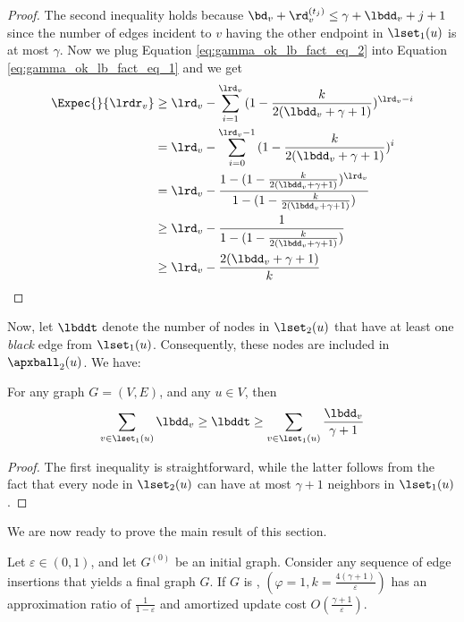 \begin{proof}
The second inequality holds because $\bd_v + \rd_v^{(t_j)} \leq \gamma + \lbdd_v + j +1$ since the number of edges incident to $v$ having the other endpoint in $\lset_1(u)$ is at most $\gamma$. Now we plug Equation \ref{eq:gamma_ok_lb_fact_eq_2} into Equation \ref{eq:gamma_ok_lb_fact_eq_1} and we get
  \begin{align}
      \Expec{}{\lrdr_v} &\geq \lrd_v - \sum_{i=1}^{\lrd_v}{(1-\frac{k}{2(\lbdd_v + \gamma + 1)})^{\lrd_v - i}} \notag \\
      &= \lrd_v - \sum_{i=0}^{\lrd_v-1}{(1-\frac{k}{2(\lbdd_v + \gamma + 1)})^{i}} \notag \\
      &= \lrd_v - \frac{1-(1-\frac{k}{2(\lbdd_v+\gamma+1)})^{\lrd_v}}{1-(1-\frac{k}{2(\lbdd_v + \gamma + 1)})} \notag \\
      &\geq \lrd_v - \frac{1}{1-(1-\frac{k}{2(\lbdd_v + \gamma + 1)})} \notag \\
      &\geq \lrd_v - \frac{2(\lbdd_v + \gamma + 1)}{k} \notag
  \end{align}
\end{proof}
Now, let $\lbddt$ denote the number of nodes in $\lset_2(u)$ that have at least one \emph{black} edge from $\lset_1(u)$. Consequently, these nodes are included in $\apxball_2(u)$. We have:

\begin{lemma}\label{lemma:gamma_ok_properties}
For any \gammaok graph $G=(V,E)$, and any $u \in V$, then
\begin{align*}
    \sum_{v \in \lset_1(u)}\lbdd_v \geq \lbddt\geq \sum_{v \in \lset_1(u)} \frac{\lbdd_v}{\gamma + 1}
\end{align*}
\end{lemma}
\begin{proof}
    The first inequality is straightforward, while the latter follows from the fact that every node in $\lset_2(u)$ can have at most $\gamma + 1$ neighbors in $\lset_1(u)$.  
\end{proof}
  
We are now ready to prove the main result of this section. 


\begin{theorem}\label{thm:gamma-ok-main}
    
Let $\varepsilon \in (0,1)$, and let $G^{(0)}$ be an initial graph. Consider any sequence of edge insertions that yields a final graph $G$. If $G$ is \gammaok, \lazyscheme$(\varphi =1,k=\frac{4(\gamma+1)}{\varepsilon})$ has an approximation ratio of  $\frac{1}{1-\varepsilon}$ and amortized update cost $O(\frac{\gamma+1}{\varepsilon})$.     
\end{theorem}

